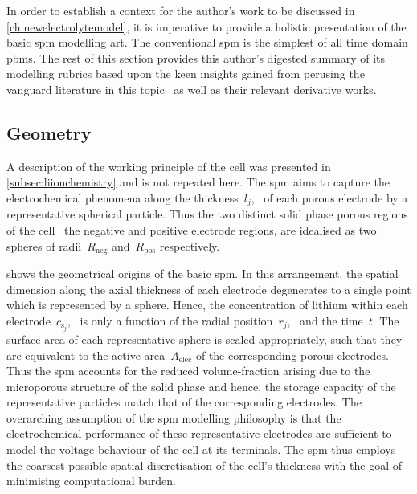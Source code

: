 
In  order  to  establish  a  context  for the  author's  work  to  be  discussed
in  \cref{ch:newelectrolytemodel},  it  is  imperative  to  provide  a  holistic
presentation of the basic \gls{spm} modelling art. The conventional \gls{spm} is
the  simplest  of  all  time  domain  \glspl{pbm}.  The  rest  of  this  section
provides  this author's  digested summary  of its  modelling rubrics  based upon
the  keen  insights  gained  from  perusing  the  vanguard  literature  in  this
topic~\cite{Santhanagopalan2006,Santhanagopalan2006a,DiDomenico2010} as  well as
their relevant derivative works.

\subsection{Geometry}\label{subsec:basicspmgeometry}

A  description  of   the  working  principle  of  the  cell   was  presented  in
\cref{subsec:liionchemistry} and  is not  repeated here.  The \gls{spm}  aims to
capture the electrochemical phenomena along the thickness~$l_j$,~\jinnegpos{} of
each  porous electrode  by a  representative  spherical particle.  Thus the  two
distinct  solid  phase porous  regions  of  the  cell \ie~the  negative  and
positive electrode regions, are idealised as two spheres of radii~$R_\text{neg}$
and~$R_\text{pos}$ respectively.


   shows   the   geometrical  origins   of   the   basic
\gls{spm}.  In  this   arrangement,  the  spatial  dimension   along  the  axial
thickness  of   each  electrode   degenerates  to  a   single  point   which  is
represented  by  a sphere.  Hence,  the  concentration  of lithium  within  each
electrode~$c_{\text{s}_j}$,~\jinnegpos{}  is  only  a  function  of  the  radial
position~$r_j$,~\jinnegpos{}  and  the  time~$t$.   The  surface  area  of  each
representative sphere is scaled appropriately,  such that they are equivalent to
the  active area~$A_\text{elec}$  of the  corresponding  porous electrodes. 
Thus the  \gls{spm} accounts  for  the  reduced  volume-fraction  arising  due 
to  the  microporous structure  of  the   solid  phase  and  hence,  the 
storage   capacity  of  the representative  particles  match  that  of  the 
corresponding  electrodes.  The overarching  assumption  of  the  \gls{spm}
modelling  philosophy  is  that  the electrochemical performance of these
representative electrodes are sufficient to model the voltage behaviour of the
cell at its terminals. The \gls{spm} thus employs the coarsest possible spatial 
discretisation of the cell's thickness  with the goal of minimising
computational burden.

